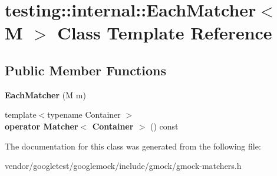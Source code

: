\hypertarget{classtesting_1_1internal_1_1EachMatcher}{}\section{testing\+:\+:internal\+:\+:Each\+Matcher$<$ M $>$ Class Template Reference}
\label{classtesting_1_1internal_1_1EachMatcher}
\subsection*{Public Member Functions}
\begin{DoxyCompactItemize}
\item 
{\bfseries Each\+Matcher} (M m)\hypertarget{classtesting_1_1internal_1_1EachMatcher_a597f567d454f85733c66f7527f9aadb7}{}\label{classtesting_1_1internal_1_1EachMatcher_a597f567d454f85733c66f7527f9aadb7}

\item 
{\footnotesize template$<$typename Container $>$ }\\{\bfseries operator Matcher$<$ Container $>$} () const \hypertarget{classtesting_1_1internal_1_1EachMatcher_ad00ab5ef26ae8c41d7d36a5ef4ed713e}{}\label{classtesting_1_1internal_1_1EachMatcher_ad00ab5ef26ae8c41d7d36a5ef4ed713e}

\end{DoxyCompactItemize}


The documentation for this class was generated from the following file\+:\begin{DoxyCompactItemize}
\item 
vendor/googletest/googlemock/include/gmock/gmock-\/matchers.\+h\end{DoxyCompactItemize}
